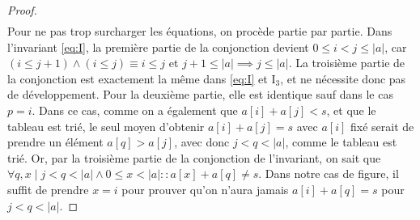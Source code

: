 \documentclass{elsarticle}
\newcommand{\abs}[1]{\left\lvert#1\right\lvert}
\begin{document}
\begin{minipage}[c]{0.65\textwidth}
\begin{proof}
\begin{align*}
\end{align*}
Pour ne pas trop surcharger les équations, on procède partie par partie.
Dans l'invariant \ref{eq:I}, la première partie de la conjonction devient $0 \le i < j \le \abs{a}$,
car $(i \le j+1) \land (i \le j) \equiv i \le j$ et $j+1 \le \abs{a} \implies j \le \abs{a}$.
La troisième partie de la conjonction est exactement la même dans \ref{eq:I} et I$_3$,
et ne nécessite donc pas de développement.
Pour la deuxième partie, elle est identique sauf dans le cas $p = i$.
Dans ce cas, comme on a également que $a[i] + a[j] < s$,
et que le tableau est trié, le seul moyen d'obtenir $a[i] + a[j] = s$ avec $a[i]$ fixé serait de prendre un élément $a[q] > a[j]$, avec donc $j  < q < \abs{a}$, comme le tableau est trié.
Or, par la troisième partie de la conjonction de l'invariant, on sait que $\forall q, x \mid j < q < \abs{a} \land 0 \le x < \abs{a} :: a[x] + a[q] \ne s$.
Dans notre cas de figure, il suffit de prendre $x = i$ pour prouver qu'on n'aura jamais $a[i] + a[q] = s$ pour $j < q < \abs{a}$.
\end{proof}
\end{minipage}
\end{document}
